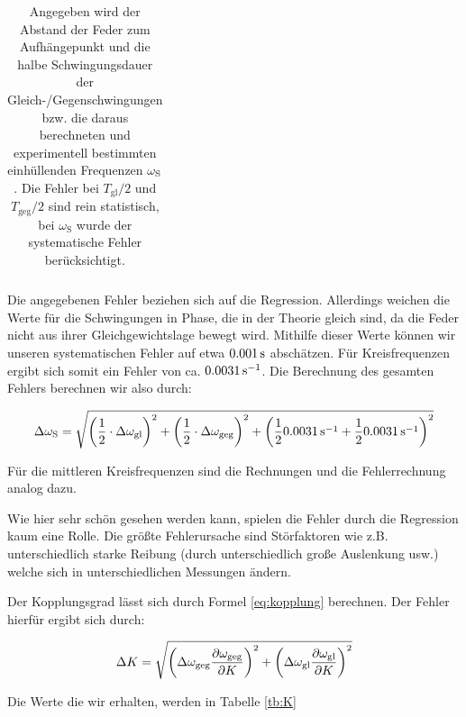 \begin{table}
{\begin{tabular}{ccccccc}
\end{tabular}
}
\caption{Angegeben wird der Abstand der Feder zum Aufhängepunkt und die halbe Schwingungsdauer der Gleich-/Gegenschwingungen bzw. die daraus berechneten und experimentell bestimmten einhüllenden Frequenzen $\omega_{\mathrm{S}}$. Die Fehler bei $T_\mathrm{gl}/2$ und $T_\mathrm{geg}/2$ sind rein statistisch, bei $\omega_\mathrm{S}$ wurde der systematische Fehler berücksichtigt.}
\label{tb:values}
\end{table}

Die angegebenen Fehler beziehen sich auf die Regression. Allerdings weichen die Werte für die Schwingungen in Phase, die in der Theorie gleich sind, da die Feder nicht aus ihrer Gleichgewichtslage bewegt wird. Mithilfe dieser Werte können wir unseren systematischen Fehler auf etwa $\unit[0.001]{s}$ abschätzen. Für Kreisfrequenzen ergibt sich somit ein Fehler von ca. $\unit[0.0031]{s^{-1}}$. Die Berechnung des gesamten Fehlers berechnen wir also durch:

\begin{equation*}
\Delta \omega_\n{S} = \sqrt{
\left(\frac{1}{2} \cdot \Delta\omega_\n{gl}\right)^2
+ 
\left(\frac{1}{2} \cdot \Delta\omega_\n{geg}\right)^2
+
\left(\frac12 \unit[0.0031]{s^{-1}} + \frac12 \unit[0.0031]{s^{-1}} \right)^2
}
\end{equation*}

Für die mittleren Kreisfrequenzen sind die Rechnungen und die Fehlerrechnung analog dazu.

Wie hier sehr schön gesehen werden kann, spielen die Fehler durch die Regression kaum eine Rolle. Die größte Fehlerursache sind Störfaktoren wie z.B. unterschiedlich starke Reibung (durch unterschiedlich große Auslenkung usw.) welche sich in unterschiedlichen Messungen ändern.

Der Kopplungsgrad lässt sich durch Formel \ref{eq:kopplung} berechnen. Der Fehler hierfür ergibt sich durch:

\begin{equation*}
\Delta K = \sqrt{
\left(\Delta \omega_{\mathrm{geg}}\frac{\partial \omega_{\mathrm{geg}}}{\partial K}\right)^2
+
\left(\Delta \omega_{\mathrm{gl}}\frac{\partial \omega_{\mathrm{gl}}}{\partial K}\right)^2
}
\end{equation*}

Die Werte die wir erhalten, werden in Tabelle \ref{tb:K}

\begin{table}[t]
\caption{Die berechnetet Werte für den Kopplungsgrad $K$}
\label{tb:K}
\end{table}


